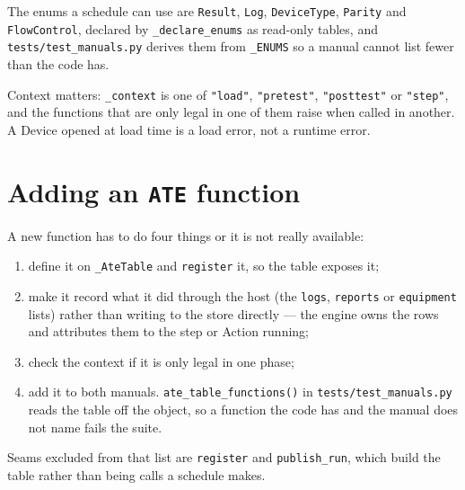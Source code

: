 The enums a schedule can use are \texttt{Result}, \texttt{Log}, \texttt{DeviceType}, \texttt{Parity} and
\texttt{FlowControl}, declared by \texttt{\_declare\_enums} as read-only tables, and
\texttt{tests/\allowbreak{}test\_\allowbreak{}manuals.py} derives them from \texttt{\_ENUMS} so a manual cannot list fewer than the
code has.

Context matters: \texttt{\_context} is one of \texttt{"load"}, \texttt{"pretest"}, \texttt{"posttest"} or
\texttt{"step"}, and the functions that are only legal in one of them raise when called in another. A
Device opened at load time is a load error, not a runtime error.

\section{Adding an \texttt{ATE} function}

A new function has to do four things or it is not really available:

\begin{enumerate}
  \item define it on \texttt{\_AteTable} and \texttt{register} it, so the table exposes it;
  \item make it record what it did through the host (the \texttt{logs}, \texttt{reports} or
    \texttt{equipment} lists) rather than writing to the store directly --- the engine owns the rows and
    attributes them to the step or Action running;
  \item check the context if it is only legal in one phase;
  \item add it to both manuals. \texttt{ate\_\allowbreak{}table\_\allowbreak{}functions()} in
    \texttt{tests/\allowbreak{}test\_\allowbreak{}manuals.py} reads the table off the object, so a function the code has and the
    manual does not name fails the suite.
\end{enumerate}

Seams excluded from that list are \texttt{register} and \texttt{publish\_run}, which build the table
rather than being calls a schedule makes.

